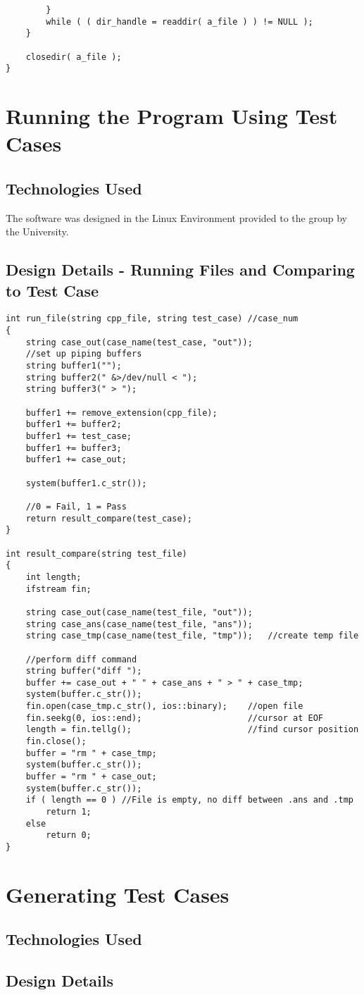 \begin{lstlisting}
        }
        while ( ( dir_handle = readdir( a_file ) ) != NULL );
    }

    closedir( a_file );
}
\end{lstlisting}

\section{Running the Program Using Test Cases }

\subsection{Technologies  Used}
The software was designed in the Linux Environment provided to the group by the University.



\subsection{Design Details - Running Files and Comparing to Test Case}


\begin{lstlisting}
int run_file(string cpp_file, string test_case) //case_num
{
    string case_out(case_name(test_case, "out"));
    //set up piping buffers
    string buffer1("");
    string buffer2(" &>/dev/null < ");
    string buffer3(" > ");

    buffer1 += remove_extension(cpp_file);
    buffer1 += buffer2;
    buffer1 += test_case;
    buffer1 += buffer3;
    buffer1 += case_out;

    system(buffer1.c_str());

    //0 = Fail, 1 = Pass
    return result_compare(test_case);
}

int result_compare(string test_file)
{
    int length;
    ifstream fin;

    string case_out(case_name(test_file, "out"));
    string case_ans(case_name(test_file, "ans"));
    string case_tmp(case_name(test_file, "tmp"));   //create temp file
    
    //perform diff command
    string buffer("diff ");
    buffer += case_out + " " + case_ans + " > " + case_tmp;
    system(buffer.c_str());    
    fin.open(case_tmp.c_str(), ios::binary);    //open file
    fin.seekg(0, ios::end);                     //cursor at EOF
    length = fin.tellg();                       //find cursor position
    fin.close();
    buffer = "rm " + case_tmp;
    system(buffer.c_str());
    buffer = "rm " + case_out;
    system(buffer.c_str());
    if ( length == 0 ) //File is empty, no diff between .ans and .tmp
        return 1;
    else
        return 0;
}
\end{lstlisting}

\section{Generating Test Cases}

\subsection{Technologies  Used}

\subsection{Design Details}

